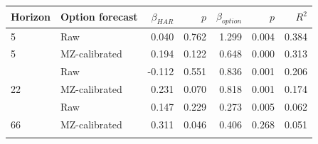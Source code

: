 \begin{tabular}{llrrrrr}
\toprule
Horizon & Option forecast & $\beta_{HAR}$ & $p$ & $\beta_{option}$ & $p$ & $R^2$ \\
\midrule
5 & Raw & 0.040 & 0.762 & 1.299 & 0.004 & 0.384 \\
5 & MZ-calibrated & 0.194 & 0.122 & 0.648 & 0.000 & 0.313 \\
\addlinespace
22 & Raw & -0.112 & 0.551 & 0.836 & 0.001 & 0.206 \\
22 & MZ-calibrated & 0.231 & 0.070 & 0.818 & 0.001 & 0.174 \\
\addlinespace
66 & Raw & 0.147 & 0.229 & 0.273 & 0.005 & 0.062 \\
66 & MZ-calibrated & 0.311 & 0.046 & 0.406 & 0.268 & 0.051 \\
\addlinespace
\bottomrule
\end{tabular}
